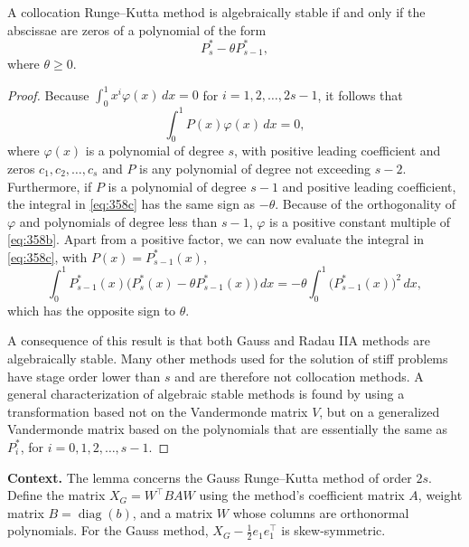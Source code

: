 \begin{theorem}

  \label{thm:358A}
A collocation Runge--Kutta method is algebraically stable if and only if the abscissae are zeros of a polynomial of the form
\[
P_s^* - \theta P_{s-1}^*,
\]
where $\theta \geq 0$.
\end{theorem}

\begin{proof}
Because $\int_0^1 x^i \varphi(x) \, dx = 0$ for $i = 1, 2, \dots, 2s - 1$, it follows that
\[
\int_0^1 P(x) \varphi(x) \, dx = 0,
\]
where $\varphi(x)$ is a polynomial of degree $s$, with positive leading coefficient and zeros $c_1, c_2, \dots, c_s$ and $P$ is any polynomial of degree not exceeding $s - 2$. Furthermore, if $P$ is a polynomial of degree $s - 1$ and positive leading coefficient, the integral in \eqref{eq:358c} has the same sign as $-\theta$. Because of the orthogonality of $\varphi$ and polynomials of degree less than $s - 1$, $\varphi$ is a positive constant multiple of \eqref{eq:358b}. Apart from a positive factor, we can now evaluate the integral in \eqref{eq:358c}, with $P(x) = P_{s-1}^*(x)$,
\[
\int_0^1 P_{s-1}^*(x) \bigl( P_s^*(x) - \theta P_{s-1}^*(x) \bigr) \, dx = -\theta \int_0^1 \bigl( P_{s-1}^*(x) \bigr)^2 \, dx,
\]
which has the opposite sign to $\theta$.

A consequence of this result is that both Gauss and Radau IIA methods are algebraically stable. Many other methods used for the solution of stiff problems have stage order lower than $s$ and are therefore not collocation methods. A general characterization of algebraic stable methods is found by using a transformation based not on the Vandermonde matrix $V$, but on a generalized Vandermonde matrix based on the polynomials that are essentially the same as $P_i^*$, for $i = 0, 1, 2, \dots, s - 1$.
\end{proof}

\noindent\textbf{Context.}
The lemma concerns the Gauss Runge--Kutta method of order $2s$.
Define the matrix $X_G = W^\top B A W$ using the method's coefficient matrix $A$, weight matrix $B = \operatorname{diag}(b)$, and a matrix $W$ whose columns are orthonormal polynomials.
For the Gauss method, $X_G - \frac12 e_1 e_1^\top$ is skew-symmetric.

